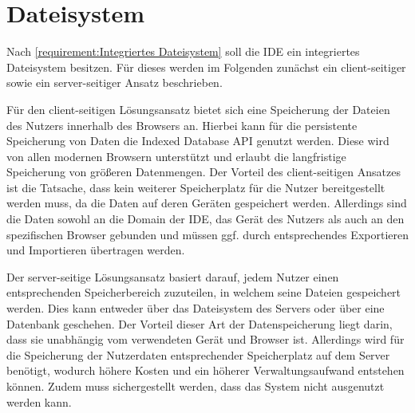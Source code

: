 \section{Dateisystem}\label{section:konzeption:dateisystem}


Nach \autoref{requirement:Integriertes Dateisystem} soll die IDE ein integriertes Dateisystem besitzen. Für dieses werden im Folgenden zunächst ein client-seitiger sowie ein server-seitiger Ansatz beschrieben.

Für den client-seitigen Lösungsansatz bietet sich eine Speicherung der Dateien des Nutzers innerhalb des Browsers an. Hierbei kann für die persistente Speicherung von Daten die Indexed Database API \cite{noauthor_indexed-database-api_nodate} genutzt werden. Diese wird von allen modernen Browsern unterstützt und erlaubt die langfristige Speicherung von größeren Datenmengen. Der Vorteil des client-seitigen Ansatzes ist die Tatsache, dass kein weiterer Speicherplatz für die Nutzer bereitgestellt werden muss, da die Daten auf deren Geräten gespeichert werden. Allerdings sind die Daten sowohl an die Domain der IDE, das Gerät des Nutzers als auch an den spezifischen Browser gebunden und müssen ggf. durch entsprechendes Exportieren und Importieren übertragen werden.

Der server-seitige Lösungsansatz basiert darauf, jedem Nutzer einen entsprechenden Speicherbereich zuzuteilen, in welchem seine Dateien gespeichert werden. Dies kann entweder über das Dateisystem des Servers oder über eine Datenbank geschehen. Der Vorteil dieser Art der Datenspeicherung liegt darin, dass sie unabhängig vom verwendeten Gerät und Browser ist. Allerdings wird für die Speicherung der Nutzerdaten entsprechender Speicherplatz auf dem Server benötigt, wodurch höhere Kosten und ein höherer Verwaltungsaufwand entstehen können. Zudem muss sichergestellt werden, dass das System nicht ausgenutzt werden kann.

